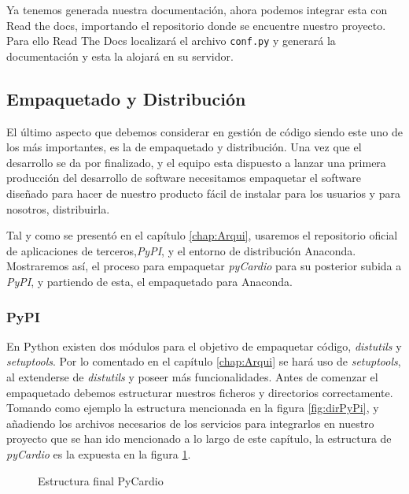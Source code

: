Ya tenemos generada nuestra documentación, ahora podemos integrar esta con Read the docs, importando el repositorio donde se encuentre nuestro proyecto. Para ello Read The Docs localizará el archivo \texttt{conf.py} y generará la documentación y esta la alojará en su servidor. 


\subsection*{Empaquetado y Distribución}

El último aspecto que debemos considerar en gestión de código siendo este uno de los más importantes, es la de empaquetado y distribución. Una vez que el desarrollo se da por finalizado, y el equipo esta dispuesto a lanzar una primera producción del desarrollo de software necesitamos empaquetar el software diseñado para hacer de nuestro producto fácil de instalar para los usuarios y para nosotros, distribuirla. 


Tal y como se presentó en el capítulo \ref{chap:Arqui}, usaremos el repositorio oficial de aplicaciones de terceros,\emph{PyPI}, y el entorno de distribución Anaconda. Mostraremos así, el proceso para empaquetar \emph{pyCardio} para su posterior subida a \emph{PyPI}, y partiendo de esta, el empaquetado para Anaconda.

\subsubsection*{PyPI}
En Python existen dos módulos para el objetivo de empaquetar código, \textit{distutils} y \textit{setuptools}. Por lo comentado en el capítulo \ref{chap:Arqui} se hará uso de \textit{setuptools}, al extenderse de \textit{distutils} y poseer más funcionalidades. Antes de comenzar el empaquetado debemos estructurar nuestros ficheros y directorios correctamente. Tomando como ejemplo la estructura mencionada en la figura \ref{fig:dirPyPi}, y añadiendo los archivos necesarios de los servicios para integrarlos en nuestro proyecto que se han ido mencionado a lo largo de este capítulo, la estructura de \emph{pyCardio} es la expuesta en la figura \ref{fig:pyCardioDir}. \\

\begin{figure}[h]
\centering
{}
\caption{Estructura final PyCardio}
\label{fig:pyCardioDir}
\end{figure}

